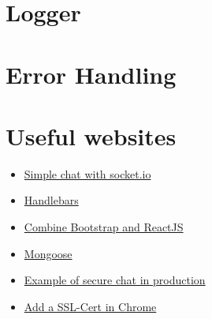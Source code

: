 \documentclass[10pt,a4paper,landscape]{article}
\begin{document}
\section{Logger}
\section{Error Handling}
\section{Useful websites}
\begin{itemize}
        \item
            \href{https://socket.io/get-started/chat/}{Simple chat with socket.io}
        \item
            \href{www.handlebars.com}{Handlebars}
        \item 
            \href{https://www.packtpub.com/books/content/getting-started-react-and-bootstrap}{Combine Bootstrap and ReactJS}
        \item
            \href{http://mongoosejs.com/docs/guide.html}{Mongoose}
        \item
            \href{https://github.com/phutchins/pipo}{Example of secure chat in production}
        \item
            \href{https://support.securly.com/hc/en-us/articles/206081828-How-to-manually-install-the-Securly-SSL-certificate-in-Chrome}{Add a SSL-Cert in Chrome}
\end{itemize}
\end{document}

